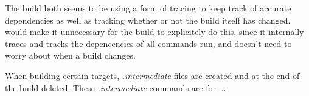 The build both seems to be using a form of tracing to keep track of accurate dependencies as well as tracking whether or not the build itself has changed.  \Rattle would make it unnecessary for the build to explicitely do this, since it internally traces and tracks the depencencies of all commands run, and doesn't need to worry about when a build changes.





When building certain targets, \emph{.intermediate} files are created and at the end of the build deleted.  These \emph{.intermediate} commands are for ...


